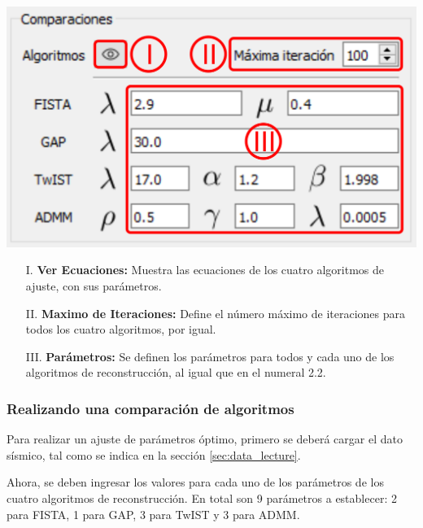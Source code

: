 \documentclass[12pt,twoside,letter]{ol-softwaremanual}
\newenvironment{Figure}
  {\par\medskip\noindent\minipage{\linewidth}}
  {\endminipage\par\medskip}
\begin{document}
\begin{multicols}{2}
	
	\begin{Figure}
		\centering
		\includegraphics[width=0.9\linewidth]{comp-panel.png}
		\label{fig:comp_panel}
	\end{Figure}	
	
	\begin{itemize}
		
		\item[I.] \textbf{Ver Ecuaciones:} Muestra las ecuaciones de los cuatro algoritmos de ajuste, con sus parámetros.
		\item[II.] \textbf{Maximo de Iteraciones:} Define el número máximo de iteraciones para todos los cuatro algoritmos, por igual.
		\item[III.] \textbf{Parámetros:} Se definen los parámetros para todos y cada uno de los algoritmos de reconstrucción, al igual que en el numeral 2.2.
		
	\end{itemize}
	
\end{multicols}

\subsubsection{Realizando una comparación de algoritmos}

Para realizar un ajuste de parámetros óptimo, primero se deberá cargar el dato sísmico, tal como se indica en la sección \ref{sec:data_lecture}.

Ahora, se deben ingresar los valores para cada uno de los parámetros de los cuatro algoritmos de reconstrucción. En total son 9 parámetros a establecer: 2 para FISTA, 1 para GAP, 3 para TwIST y 3 para ADMM.
\end{document}
